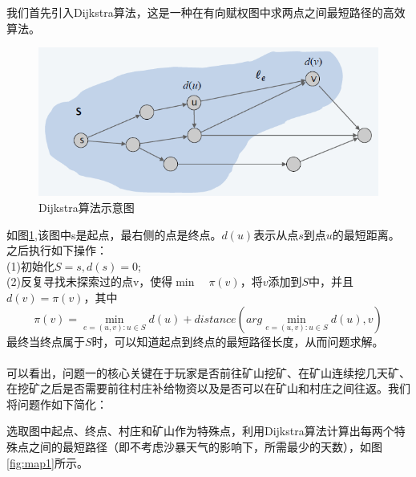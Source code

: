 \documentclass[withoutpre]{cumcmthesis} %
\begin{document}
我们首先引入Dijkstra算法，这是一种在有向赋权图中求两点之间最短路径的高效算法。
\begin{figure}[H]
	\centering
	\includegraphics[scale=0.7]{figures/Dijkstra.png}
	\caption{Dijkstra算法示意图}
	\label{fig:Dijkstra}
\end{figure}
如图\ref{fig:Dijkstra},该图中s是起点，最右侧的点是终点。$d(u)$表示从点$s$到点$u$的最短距离。之后执行如下操作：\\
(1)初始化$S={s},d(s)=0$;\\
(2)反复寻找未探索过的点v，使得$\min\quad\pi(v)$，将$v$添加到$S$中，并且$d(v)=\pi(v)$，其中
$$\pi(v)=\min_{e=(u,v):u\in S}d(u)+distance(arg\min_{e=(u,v):u\in S}d(u),v)$$
最终当终点属于$S$时，可以知道起点到终点的最短路径长度，从而问题求解。\\\\
可以看出，问题一的核心关键在于玩家是否前往矿山挖矿、在矿山连续挖几天矿、在挖矿之后是否需要前往村庄补给物资以及是否可以在矿山和村庄之间往返。我们将问题作如下简化：

选取图中起点、终点、村庄和矿山作为特殊点，利用Dijkstra算法计算出每两个特殊点之间的最短路径（即不考虑沙暴天气的影响下，所需最少的天数），如图\ref{fig:map1}所示。
\end{document}
